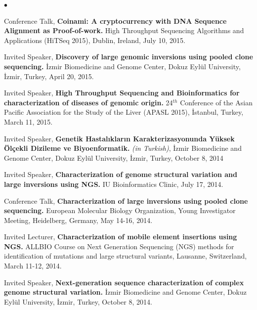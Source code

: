 \documentclass[margin,line]{res}
\newenvironment{list2}{
  \begin{list}{$\bullet$}{%
      \setlength{\itemsep}{0in}
      \setlength{\parsep}{0in} \setlength{\parskip}{0in}
      \setlength{\topsep}{0in} \setlength{\partopsep}{0in} 
      \setlength{\leftmargin}{0.2in}}}{\end{list}}
\begin{document}
\begin{resume}
\begin{list2}
\item
  Conference Talk, 
  {\bf Coinami: A cryptocurrency with DNA Sequence Alignment as Proof-of-work.}
  High Throughput Sequencing Algorithms and Applications (HiTSeq 2015), Dublin, Ireland, July 10, 2015.
\item
  Invited Speaker, 
  {\bf Discovery of large genomic inversions using pooled clone sequencing.}
  İzmir Biomedicine and Genome Center, Dokuz Eylül University, İzmir, Turkey, April 20, 2015.
\item
  Invited Speaker, 
  {\bf High Throughput Sequencing and Bioinformatics for characterization of diseases of genomic origin.}
  24$^{th}$ Conference of the Asian Pacific Association for the Study of the Liver (APASL 2015), İstanbul, Turkey, March 11, 2015.
\item
  Invited Speaker, 
  {\bf Genetik Hastalıkların Karakterizasyonunda Yüksek Ölçekli Dizileme ve Biyoenformatik.} {\it (in Turkish)},
  İzmir Biomedicine and Genome Center, Dokuz Eylül University, İzmir, Turkey, October 8, 2014

\item
  Invited Speaker, 
  {\bf Characterization of  genome structural variation and large inversions using NGS.}
  IU Bioinformatics Clinic, July 17, 2014. 

\item
  Conference Talk, 
  {\bf Characterization of large inversions using pooled clone sequencing.}
  European Molecular Biology Organization, Young Investigator Meeting, Heidelberg, Germany, May 14-16, 2014.

\item
  Invited Lecturer, 
  {\bf Characterization of mobile element insertions using NGS.}
  ALLBIO Course on Next Generation Sequencing (NGS) methods for identification of mutations and large structural variants,
  Lausanne, Switzerland, March 11-12, 2014.
\item
  Invited Speaker, 
  {\bf  Next-generation sequence characterization of complex genome structural variation.}
  İzmir Biomedicine and Genome Center, Dokuz Eylül University, İzmir, Turkey, October 8, 2014.


\end{list2}
\end{resume}
\end{document}
